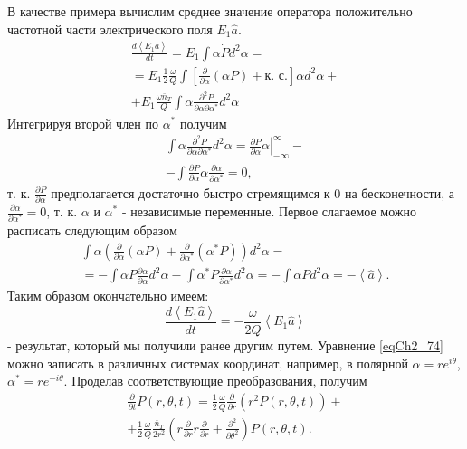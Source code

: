 В качестве примера вычислим среднее значение оператора положительно
частотной части электрического поля $E_1\hat{a}$.   
\begin{eqnarray}
\frac{d \left<E_1\hat{a}\right>}{d t} = 
E_1\int \alpha \dot{P}d^2 \alpha =
\nonumber \\
=E_1 \frac{1}{2}\frac{\omega}{Q}
\int \left[
\frac{\partial}{\partial \alpha}\left(\alpha P\right) + \mbox{к. с.}
\right]\alpha d^2 \alpha +
\nonumber \\
+E_1\frac{\omega \bar{n}_T}{Q}\int \alpha
\frac{\partial^2 P}{\partial \alpha \partial \alpha^{*}}
d^2 \alpha
\label{eqCh2_75}
\end{eqnarray}
Интегрируя второй член по $\alpha^{*}$ получим
\begin{eqnarray}
\int\alpha\frac{\partial^2 P}{\partial \alpha \partial \alpha^{*}}
d^2 \alpha = 
\left.\frac{\partial P}{\partial
  \alpha}\alpha\right|_{-\infty}^{\infty} - 
\nonumber \\
- \int \frac{\partial P}{\partial \alpha} \alpha
\frac{\partial \alpha}{\partial \alpha^{*}} = 0,
\nonumber
\end{eqnarray}
т. к. $\frac{\partial P}{\partial \alpha}$ предполагается достаточно
быстро стремящимся к 0 на бесконечности, а 
$\frac{\partial \alpha}{\partial \alpha^{*}} = 0$, т. к. 
$\alpha$ и $\alpha^{*}$ - независимые переменные.
Первое слагаемое можно расписать следующим образом
\begin{eqnarray}
\int \alpha \left(
\frac{\partial}{\partial \alpha}\left(\alpha P\right) + 
\frac{\partial}{\partial \alpha^{*}}\left(\alpha^{*} P\right)
\right) d^2 \alpha = 
\nonumber \\
= - \int \alpha P \frac{\partial \alpha}{\partial \alpha} d^2 \alpha -
\int \alpha^{*} P \frac{\partial \alpha}{\partial \alpha^{*}} d^2 \alpha  
= - \int \alpha P  d^2 \alpha
= - \left<\hat{a}\right>.
\nonumber
\end{eqnarray}
Таким образом окончательно имеем: 
\begin{equation}
\frac{d \left<E_1\hat{a}\right>}{d t} = 
-\frac{\omega}{2 Q}\left<E_1\hat{a}\right>
\label{eqCh2_76}
\end{equation}
- результат, который мы получили ранее другим путем. Уравнение
\eqref{eqCh2_74} можно записать в различных системах координат,
например, в полярной $\alpha = r e^{i \theta}$, $\alpha^{*} = r e^{- i
  \theta}$.  Проделав соответствующие преобразования, получим 
\begin{eqnarray}
\frac{\partial}{\partial t}P\left(r, \theta, t\right) = 
\frac{1}{2}\frac{\omega}{Q}
\frac{\partial}{\partial r}
\left(r^2 P\left(r, \theta, t\right)\right) +
\nonumber \\
+ \frac{1}{2}\frac{\omega}{Q}
\frac{\bar{n}_T}{2 r^2}
\left(
r \frac{\partial}{\partial r} r \frac{\partial}{\partial r} +
\frac{\partial^2}{\partial \theta^2}
\right)
P\left(r, \theta, t\right).
\label{eqCh2_77}
\end{eqnarray}
